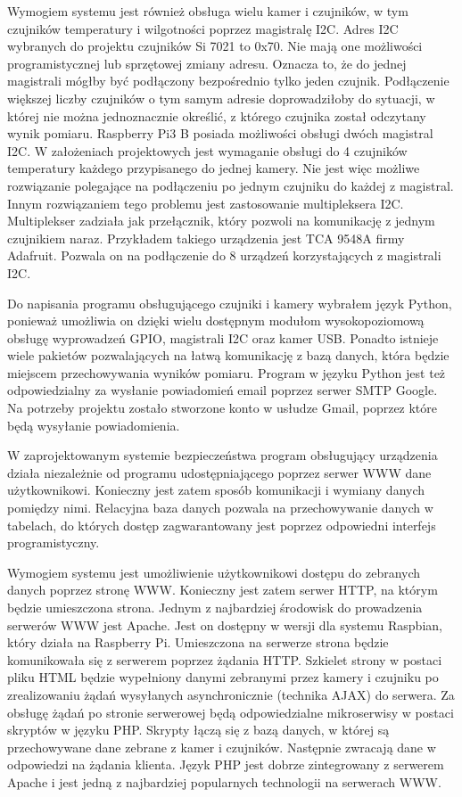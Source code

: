 \documentclass[a4paper,12pt,twoside]{article}
\begin{document}
Wymogiem systemu jest również obsługa wielu kamer i czujników, w tym czujników temperatury i wilgotności poprzez magistralę I2C. Adres I2C wybranych do projektu czujników Si 7021 to 0x70. Nie mają one możliwości programistycznej lub sprzętowej zmiany adresu. Oznacza to, że do jednej magistrali mógłby być podłączony bezpośrednio tylko jeden czujnik. Podłączenie większej liczby czujników o tym samym adresie doprowadziłoby do sytuacji, w której nie można jednoznacznie określić, z którego czujnika został odczytany wynik pomiaru. Raspberry Pi3 B posiada możliwości obsługi dwóch magistral I2C. W założeniach projektowych jest wymaganie obsługi do 4 czujników temperatury każdego przypisanego do jednej kamery. Nie jest więc możliwe rozwiązanie polegające na podłączeniu po jednym czujniku do każdej z magistral. Innym rozwiązaniem tego problemu jest zastosowanie multipleksera I2C. Multiplekser zadziała jak przełącznik, który pozwoli na komunikację z jednym czujnikiem naraz. Przykładem takiego urządzenia jest TCA 9548A firmy Adafruit. Pozwala on na podłączenie do 8 urządzeń korzystających z magistrali I2C.

Do napisania programu obsługującego czujniki i kamery wybrałem język Python, ponieważ umożliwia on dzięki wielu dostępnym modułom wysokopoziomową obsługę wyprowadzeń GPIO, magistrali I2C oraz kamer USB. Ponadto istnieje wiele pakietów pozwalających na łatwą komunikację z bazą danych, która będzie miejscem przechowywania wyników pomiaru. Program w języku Python jest też odpowiedzialny za wysłanie powiadomień email poprzez serwer SMTP Google. Na potrzeby projektu zostało stworzone konto w usłudze Gmail, poprzez które będą wysyłanie powiadomienia. 

W zaprojektowanym systemie bezpieczeństwa program obsługujący urządzenia działa niezależnie od programu udostępniającego poprzez serwer WWW dane użytkownikowi. Konieczny jest zatem sposób komunikacji i wymiany danych pomiędzy nimi. Relacyjna baza danych pozwala na przechowywanie danych w tabelach, do których dostęp zagwarantowany jest poprzez odpowiedni interfejs programistyczny. 

Wymogiem systemu jest umożliwienie użytkownikowi dostępu do zebranych danych poprzez stronę WWW. Konieczny jest zatem serwer HTTP, na którym będzie umieszczona strona. Jednym z najbardziej środowisk do prowadzenia serwerów WWW jest Apache. Jest on dostępny w wersji dla systemu Raspbian, który działa na Raspberry Pi. Umieszczona na serwerze strona będzie komunikowała się z serwerem poprzez żądania HTTP. Szkielet strony w postaci pliku HTML będzie wypełniony danymi zebranymi przez kamery i czujniku po zrealizowaniu żądań wysyłanych asynchronicznie (technika AJAX) do serwera. Za obsługę żądań po stronie serwerowej będą odpowiedzialne mikroserwisy w postaci skryptów w języku PHP. Skrypty łączą się z bazą danych, w której są przechowywane dane zebrane z kamer i czujników. Następnie zwracają dane w odpowiedzi na żądania klienta. Język PHP jest dobrze zintegrowany z serwerem Apache i jest jedną z najbardziej popularnych technologii na serwerach WWW. 
\end{document}

